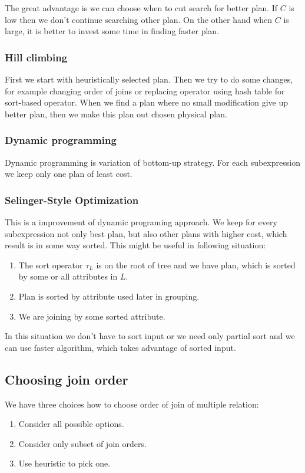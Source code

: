 The great advantage is we can choose when to cut search for better plan. If $C$ is low then we don't continue searching other plan. On the other hand when $C$ is large, it is better to invest some time in finding faster plan.
\subsubsection{Hill climbing}

First we start with heuristically selected plan. Then we try to do some changes, for example changing order of joins or replacing operator using hash table for sort-based operator. When we find a plan where no small modification give up better plan, then we make this plan out chosen physical plan.

\subsubsection{Dynamic programming}
Dynamic programming is variation of bottom-up strategy. For each subexpression we keep only one plan of least cost.

\subsubsection{Selinger-Style Optimization}
This is a improvement of dynamic programing approach. We keep for every subexpression not only best plan, but also other plans with higher cost, which result is in some way sorted. This might be useful in following situation:
\begin{enumerate}
\item The sort operator $\tau_L$ is on the root of tree and we have plan, which is sorted by some or all attributes in $L$.
\item Plan is sorted by attribute used later in grouping.
\item We are joining by some sorted attribute.
\end{enumerate}
In this situation we don't have to sort input or we need only partial sort and we can use faster algorithm, which takes advantage of sorted input.


\subsection{Choosing join order}
\label{joinOrder}
 We have three choices how to choose order of join of multiple relation:
\begin{enumerate}
\item Consider all possible options.
\item Consider only subset of join orders.
\item Use heuristic to pick one.
\end{enumerate}
 

